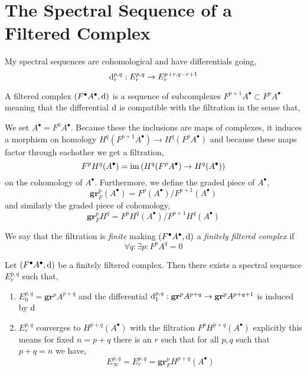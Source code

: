 \documentclass[12pt]{article}
\newcommand{\Da}{\mbox{\usefont{T2A}{\rmdefault}{m}{n}\CYRD}}
\begin{document}
\section{The Spectral Sequence of a Filtered Complex} 

\renewcommand{\gr}{\mathbf{gr}}
\newcommand{\Tot}{\mathrm{Tot}}
\newcommand{\R}{\mathbf{R}}
\newcommand{\Hdr}{\mathcal{H}_{\dR}}
\newcommand{\GM}{\Da}
\newcommand{\bH}{\mathbb{H}}

\begin{rmk}
My spectral sequences are cohomological and have differentials going,
\[ \mathrm{d}_r^{p,q} : E_r^{p,q} \to E_r^{p+r, q-r+1} \]
\end{rmk}


\begin{defn}
A filtered complex $(F^\bullet A^\bullet, \mathrm{d})$ is a sequence of subcomplexes $F^{p+1} A^\bullet \subset F^p A^\bullet$ meaning that the differential $\mathrm{d}$ is compatible with the filtration in the sense that,
\begin{center}
\end{center}
We set $A^\bullet = F^0 A^\bullet$. Because these the inclusions are maps of complexes, it induces a morphism on homology $H^q(F^{p+1} A^\bullet) \to H^q(F^{p} A^\bullet)$ and because these maps factor through eachother we get a filtration,
\[ F^p H^q(A^\bullet) = \operatorname{\mathrm{im}}{(H^q(F^p A^\bullet) \to H^q(A^\bullet))} \]
on the cohomology of $A^\bullet$. Furthermore, we define the graded piece of $A^\bullet$,
\[ \gr_F^p(A^\bullet) = F^p(A^\bullet) / F^{p+1}(A^\bullet) \]
and similarly the graded piece of cohomology,
\[ \gr_F^p H^q = F^p H^q(A^\bullet) / F^{p+1} H^q(A^\bullet) \]
\end{defn}

\begin{defn}
We say that the filtration is \textit{finite} making $(F^\bullet A^\bullet, \mathrm{d})$ a \textit{finitely filtered complex} if 
\[ \forall q : \exists p : F^p A^q = 0 \]
\end{defn}

\begin{prop}
Let $(F^\bullet A^\bullet, \mathrm{d})$ be a finitely filtered complex. Then there exists a spectral sequence $E^{p,q}_r$ such that,
\begin{enumerate}
\item $E^{p,q}_0 = \gr^p A^{p+q}$ and the differential $\d_1^{p,q} : \gr^{p} A^{p+q} \to \gr^{p} A^{p+q+1}$ is induced by $\mathrm{d}$ 
\item $E^{p,q}_r$ converges to $H^{p+q}(A^\bullet)$ with the filtration $F^p H^{p+q}(A^\bullet)$ explicitly this means for fixed $n = p+q$ there is an $r$ such that for all $p,q$ such that $p + q = n$ we have,
\[ E^{p,q}_{\infty} = E^{p,q}_r = \gr^p_F H^{p+q}(A^\bullet) \]
\end{enumerate}
\end{prop}
\end{document}
